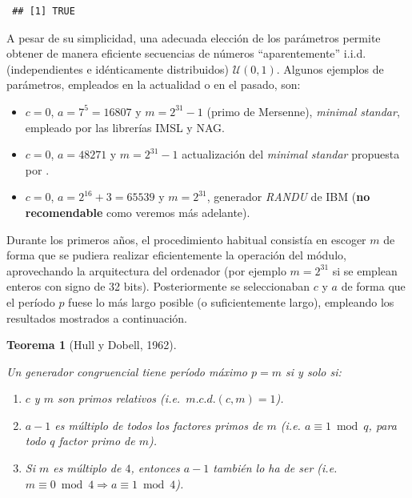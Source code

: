 \documentclass[
  10pt,
]{book}
\theoremstyle{break}
\newtheorem{theorem}{Teorema}[chapter]
\theoremstyle{nonumberplain}
\begin{document}
\begin{verbatim}
 ## [1] TRUE
\end{verbatim}

A pesar de su simplicidad, una adecuada elección de los parámetros permite obtener de manera eficiente secuencias de números ``aparentemente'' i.i.d. (independientes e idénticamente distribuidos) \(\mathcal{U}(0,1)\).
Algunos ejemplos de parámetros, empleados en la actualidad o en el pasado, son:

\begin{itemize}
\item
  \(c=0\), \(a=7^{5}=16807\) y \(m=2^{31}-1\) (primo de Mersenne), \citet{park1988}
  \emph{minimal standar}, empleado por las librerías IMSL y NAG.
\item
  \(c=0\), \(a=48271\) y \(m=2^{31}-1\) actualización del \emph{minimal standar}
  propuesta por \citet{park1993}.
\item
  \(c=0\), \(a=2^{16}+3=65539\) y \(m=2^{31}\), generador \emph{RANDU} de IBM
  (\textbf{no recomendable} como veremos más adelante).
\end{itemize}

Durante los primeros años, el procedimiento habitual consistía en escoger \(m\) de forma que se pudiera realizar eficientemente la operación del módulo, aprovechando la arquitectura del ordenador (por ejemplo \(m = 2^{31}\) si se emplean enteros con signo de 32 bits).
Posteriormente se seleccionaban \(c\) y \(a\) de forma que el período \(p\) fuese lo más largo posible (o suficientemente largo), empleando los resultados mostrados a continuación.

\begin{theorem}[Hull y Dobell, 1962]
\protect\hypertarget{thm:hull-dobell}{}\label{thm:hull-dobell}

Un generador congruencial tiene período máximo \(p = m\) si y solo si:

\begin{enumerate}
\def\labelenumi{\arabic{enumi}.}
\item
  \(c\) y \(m\) son primos relativos (i.e.~\(m.c.d.(c, m) = 1\)).
\item
  \(a-1\) es múltiplo de todos los factores primos de \(m\) (i.e.
  \(a \equiv 1 \bmod q\), para todo \(q\) factor primo de \(m\)).
\item
  Si \(m\) es múltiplo de \(4\), entonces \(a-1\) también lo ha de
  ser (i.e.~\(m \equiv 0 \bmod 4\Rightarrow a \equiv 1 \bmod 4\)).
\end{enumerate}

\end{theorem}
\end{document}
